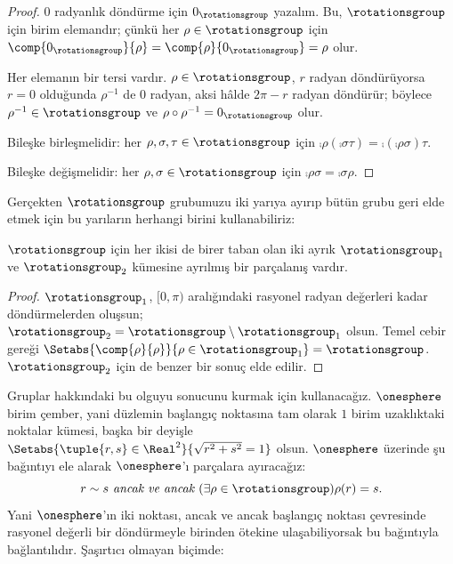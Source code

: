 \begin{proof}
$0$ radyanlık döndürme için $0_{\rotationsgroup}$ yazalım. Bu,
$\rotationsgroup$ için birim elemandır; çünkü her
$\rho\in\rotationsgroup$ için
$\comp{0_{\rotationsgroup}}{\rho}=\comp{\rho}{0_{\rotationsgroup}}=
\rho$ olur.

Her elemanın bir tersi vardır. $\rho\in\rotationsgroup$, $r$ radyan
döndürüyorsa $r=0$ olduğunda $\rho^{-1}$ de $0$ radyan, aksi hâlde
$2\pi-r$ radyan döndürür; böylece $\rho^{-1}\in\rotationsgroup$ ve
$\rho\circ\rho^{-1}=0_\rotationsgroup$ olur.

Bileşke birleşmelidir: her
$\rho,\sigma,\tau\in\rotationsgroup$ için
$\comp{\rho}{(\comp{\sigma}{\tau})}=
\comp{(\comp{\rho}{\sigma})}{\tau}$.

Bileşke değişmelidir: her $\rho,\sigma\in\rotationsgroup$ için
$\comp{\rho}{\sigma}=\comp{\sigma}{\rho}$.
\end{proof}

Gerçekten $\rotationsgroup$ grubumuzu iki yarıya ayırıp bütün grubu geri
elde etmek için bu yarıların herhangi birini kullanabiliriz:

\begin{lem}
$\rotationsgroup$ için her ikisi de birer taban olan iki ayrık
$\rotationsgroup_{1}$ ve $\rotationsgroup_{2}$ kümesine ayrılmış bir
parçalanış vardır.
\end{lem}

\begin{proof}
$\rotationsgroup_{1}$, $[0,\pi)$ aralığındaki rasyonel radyan değerleri
kadar döndürmelerden oluşsun;
$\rotationsgroup_2=\rotationsgroup\setminus\rotationsgroup_1$ olsun.
Temel cebir gereği
$\Setabs{\comp{\rho}{\rho}}{\rho\in\rotationsgroup_1}=
\rotationsgroup$. $\rotationsgroup_2$ için de benzer bir sonuç elde edilir.
\end{proof}

Gruplar hakkındaki bu olguyu  sonucunu kurmak için
kullanacağız. $\onesphere$ birim çember, yani düzlemin başlangıç noktasına
tam olarak $1$ birim uzaklıktaki noktalar kümesi, başka bir deyişle
$\Setabs{\tuple{r,s}\in\Real^2}{\sqrt{r^2+s^2}=1}$ olsun. $\onesphere$
üzerinde şu bağıntıyı ele alarak $\onesphere$'ı parçalara ayıracağız:
\[
	r \sim s \emph{ ancak ve ancak }(\exists \rho \in \rotationsgroup)\rho(r) = s.
\]
Yani $\onesphere$'ın iki noktası, ancak ve ancak başlangıç noktası
çevresinde rasyonel değerli bir döndürmeyle birinden ötekine
ulaşabiliyorsak bu bağıntıyla bağlantılıdır. Şaşırtıcı olmayan biçimde:

